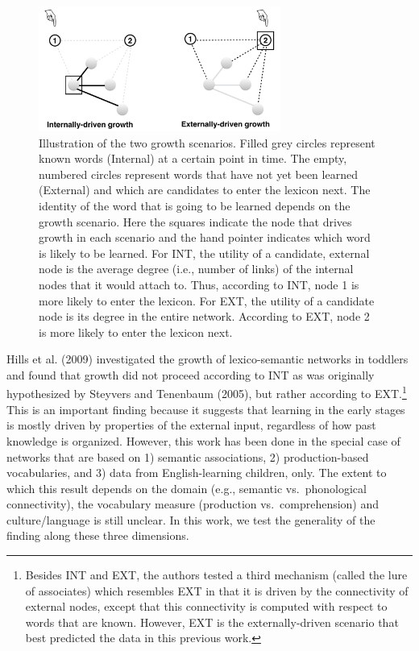 \documentclass[english,floatsintext,man]{apa6}
\theoremstyle{definition}
\theoremstyle{definition}
\theoremstyle{definition}
\theoremstyle{remark}
\begin{document}
\begin{figure}

{\centering \includegraphics[width=300px]{figs/growth3} 

}

\caption{Illustration of the two growth scenarios. Filled grey circles represent known words (Internal) at a certain point in time. The empty, numbered circles represent words that have not yet been learned (External) and which are candidates to enter the lexicon next. The identity of the word that is going to be learned depends on the growth scenario.  Here the squares indicate the node that drives growth in each scenario and the hand pointer indicates which word is likely to be learned. For INT, the utility of a candidate, external node is the average degree (i.e., number of links) of the internal nodes that it would attach to. Thus, according to INT, node 1 is more likely to enter the lexicon. For EXT, the utility of a candidate node is its degree in the entire network. According to EXT, node 2 is more likely to enter the lexicon next.}\label{fig:growth}
\end{figure}

Hills et al. (2009) investigated the growth of lexico-semantic networks
in toddlers and found that growth did not proceed according to INT as
was originally hypothesized by Steyvers and Tenenbaum (2005), but rather
according to
EXT.\footnote{Besides INT and EXT, the authors tested a third mechanism (called the lure of associates) which resembles EXT in that it is driven by the connectivity of external nodes, except that this connectivity is computed with respect to words that are known. However, EXT is the externally-driven scenario that best predicted the data in this previous work.}
This is an important finding because it suggests that learning in the
early stages is mostly driven by properties of the external input,
regardless of how past knowledge is organized. However, this work has
been done in the special case of networks that are based on 1) semantic
associations, 2) production-based vocabularies, and 3) data from
English-learning children, only. The extent to which this result depends
on the domain (e.g., semantic vs.~phonological connectivity), the
vocabulary measure (production vs.~comprehension) and culture/language
is still unclear. In this work, we test the generality of the finding
along these three dimensions.
\end{document}
